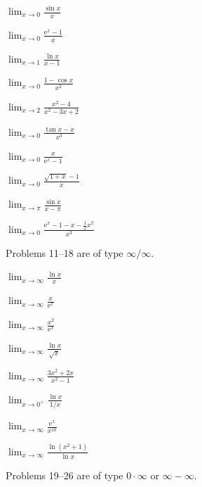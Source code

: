 \begin{problems}
  \item $\displaystyle\lim_{x\to0}\frac{\sin x}{x}$
  \item $\displaystyle\lim_{x\to0}\frac{\mathrm{e}^{x}-1}{x}$
  \item $\displaystyle\lim_{x\to1}\frac{\ln x}{x-1}$
  \item $\displaystyle\lim_{x\to0}\frac{1-\cos x}{x^{2}}$
  \item $\displaystyle\lim_{x\to2}\frac{x^{2}-4}{x^{2}-3x+2}$
  \item $\displaystyle\lim_{x\to0}\frac{\tan x-x}{x^{3}}$
  \item $\displaystyle\lim_{x\to0}\frac{x}{\mathrm{e}^{x}-1}$
  \item $\displaystyle\lim_{x\to0}\frac{\sqrt{1+x}-1}{x}$
  \item $\displaystyle\lim_{x\to\pi}\frac{\sin x}{x-\pi}$
  \item $\displaystyle\lim_{x\to0}
        \frac{\mathrm{e}^{x}-1-x-\tfrac12x^{2}}{x^{3}}$
\end{problems}

Problems 11--18 are of type $\infty/\infty$.

\begin{problems}[resume]
  \item $\displaystyle\lim_{x\to\infty}\frac{\ln x}{x}$
  \item $\displaystyle\lim_{x\to\infty}\frac{x}{\mathrm{e}^{x}}$
  \item $\displaystyle\lim_{x\to\infty}\frac{x^{2}}{\mathrm{e}^{x}}$
  \item $\displaystyle\lim_{x\to\infty}\frac{\ln x}{\sqrt{x}}$
  \item $\displaystyle\lim_{x\to\infty}\frac{3x^{2}+2x}{x^{2}-1}$
  \item $\displaystyle\lim_{x\to0^{+}}\frac{\ln x}{1/x}$
  \item $\displaystyle\lim_{x\to\infty}\frac{\mathrm{e}^{x}}{x^{10}}$
  \item $\displaystyle\lim_{x\to\infty}\frac{\ln(x^{2}+1)}{\ln x}$
\end{problems}

Problems 19--26 are of type $0\cdot\infty$ or $\infty-\infty$.

